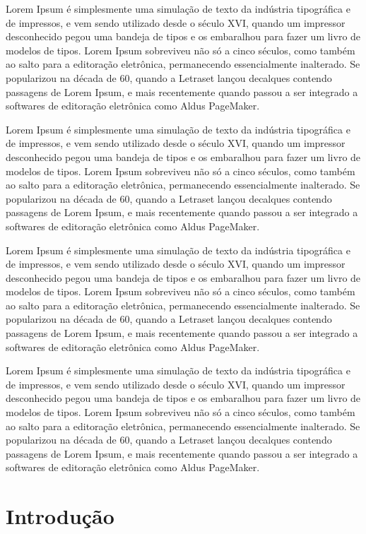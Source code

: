 \documentclass[12pt, a4paper, oneside]{book}
\begin{document}
Lorem Ipsum é simplesmente uma simulação de texto da indústria tipográfica e de impressos, e vem sendo utilizado desde o século XVI, quando um impressor desconhecido pegou uma bandeja de tipos e os embaralhou para fazer um livro de modelos de tipos. Lorem Ipsum sobreviveu não só a cinco séculos, como também ao salto para a editoração eletrônica, permanecendo essencialmente inalterado. Se popularizou na década de 60, quando a Letraset lançou decalques contendo passagens de Lorem Ipsum, e mais recentemente quando passou a ser integrado a softwares de editoração eletrônica como Aldus PageMaker.

Lorem Ipsum é simplesmente uma simulação de texto da indústria tipográfica e de impressos, e vem sendo utilizado desde o século XVI, quando um impressor desconhecido pegou uma bandeja de tipos e os embaralhou para fazer um livro de modelos de tipos. Lorem Ipsum sobreviveu não só a cinco séculos, como também ao salto para a editoração eletrônica, permanecendo essencialmente inalterado. Se popularizou na década de 60, quando a Letraset lançou decalques contendo passagens de Lorem Ipsum, e mais recentemente quando passou a ser integrado a softwares de editoração eletrônica como Aldus PageMaker.

Lorem Ipsum é simplesmente uma simulação de texto da indústria tipográfica e de impressos, e vem sendo utilizado desde o século XVI, quando um impressor desconhecido pegou uma bandeja de tipos e os embaralhou para fazer um livro de modelos de tipos. Lorem Ipsum sobreviveu não só a cinco séculos, como também ao salto para a editoração eletrônica, permanecendo essencialmente inalterado. Se popularizou na década de 60, quando a Letraset lançou decalques contendo passagens de Lorem Ipsum, e mais recentemente quando passou a ser integrado a softwares de editoração eletrônica como Aldus PageMaker.

Lorem Ipsum é simplesmente uma simulação de texto da indústria tipográfica e de impressos, e vem sendo utilizado desde o século XVI, quando um impressor desconhecido pegou uma bandeja de tipos e os embaralhou para fazer um livro de modelos de tipos. Lorem Ipsum sobreviveu não só a cinco séculos, como também ao salto para a editoração eletrônica, permanecendo essencialmente inalterado. Se popularizou na década de 60, quando a Letraset lançou decalques contendo passagens de Lorem Ipsum, e mais recentemente quando passou a ser integrado a softwares de editoração eletrônica como Aldus PageMaker.

\chapter{Introdução}
\end{document}
